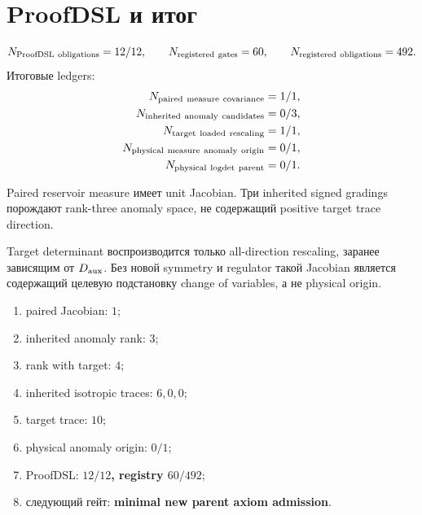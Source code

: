\section{ProofDSL и итог}

\begin{equation}
 N_{\rm ProofDSL\ obligations}=12/12,
 \qquad N_{\rm registered\ gates}=60,
 \qquad N_{\rm registered\ obligations}=492.
 \label{eq:v9-kms-anomaly-proofdsl}
\end{equation}
Итоговые ledgers:
\begin{equation}
 \begin{aligned}
 N_{\rm paired\ measure\ covariance}&=1/1,\\
 N_{\rm inherited\ anomaly\ candidates}&=0/3,\\
 N_{\rm target\ loaded\ rescaling}&=1/1,\\
 N_{\rm physical\ measure\ anomaly\ origin}&=0/1,\\
 N_{\rm physical\ logdet\ parent}&=0/1.
 \end{aligned}
 \label{eq:v9-kms-anomaly-ledger}
\end{equation}

\begin{theorem}
Paired reservoir measure имеет unit Jacobian. Три inherited signed
gradings порождают rank-three anomaly space, не содержащий positive target
trace direction.
\end{theorem}

\begin{nogocriterion}
Target determinant воспроизводится только all-direction rescaling,
заранее зависящим от $D_{\rm aux}$. Без новой symmetry и regulator такой
Jacobian является содержащий целевую подстановку change of variables, а не physical origin.
\end{nogocriterion}

\begin{protocol}\begin{enumerate}
\item paired Jacobian: \textbf{$1$};
\item inherited anomaly rank: \textbf{$3$};
\item rank with target: \textbf{$4$};
\item inherited isotropic traces: \textbf{$6,0,0$};
\item target trace: \textbf{$10$};
\item physical anomaly origin: \textbf{$0/1$};
\item ProofDSL: \textbf{$12/12$, registry $60/492$};
\item следующий гейт: \textbf{minimal new parent axiom admission}.
\end{enumerate}\end{protocol}

